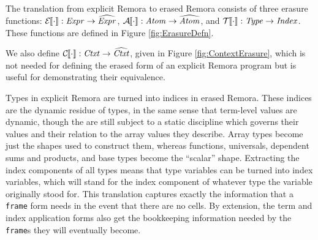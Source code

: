 \FigErasedSemantics

The translation from explicit Remora to erased Remora consists of three erasure functions:
$\mathcal{E}{\hskip-.25em}\left\llbracket \cdot \right\rrbracket : \mathit{Expr} \rightarrow \widehat{\mathit{Expr}}$,
$\mathcal{A}{\hskip-.25em}\left\llbracket \cdot \right\rrbracket : \mathit{Atom} \rightarrow \widehat{\mathit{Atom}}$,
and $\mathcal{T}{\hskip-.25em}\left\llbracket \cdot \right\rrbracket : \mathit{Type} \rightarrow \mathit{Index}$.
These functions are defined in Figure \ref{fig:ErasureDefn}.

\ErasureDefn

We also define $\mathcal{C}{\hskip-.25em}\left\llbracket \cdot \right\rrbracket : \mathit{Ctxt} \rightarrow \widehat{\mathit{Ctxt}}$,
given in Figure \ref{fig:ContextErasure},
which is not needed for defining the erased form of an explicit Remora program
but is useful for demonstrating their equivalence.

\ContextErasure

Types in explicit Remora are turned into indices in erased Remora.
These indices are the dynamic residue of types,
in the same sense that term-level values are dynamic,
though the are still subject to a static discipline which governs their values
and their relation to the array values they describe.
Array types become just the shapes used to construct them,
whereas functions, universals, dependent sums and products, and base types
become the ``scalar'' shape.
Extracting the index components of all types means that type variables
can be turned into index variables,
which will stand for the index component of whatever type the variable originally stood for.
This translation captures exactly the information that a {\tt frame} form needs
in the event that there are no cells.
By extension, the term and index application forms
also get the bookkeeping information needed by
the {\tt frame}s they will eventually become.

